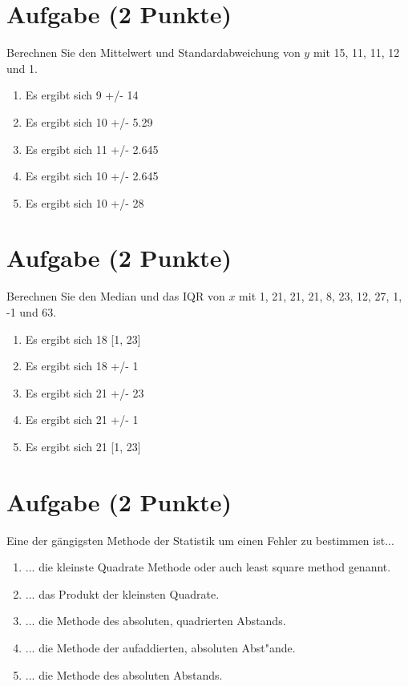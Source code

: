 \documentclass[a4paper, 10pt]{scrartcl}\usepackage[]{graphicx}\usepackage[]{xcolor}
\begin{document}
\section{Aufgabe \hfill (2 Punkte)}




Berechnen Sie den Mittelwert und Standardabweichung von $y$ mit 15, 11, 11, 12 und 1.



\begin{enumerate}
\item [\textbf{A} \msquare] Es ergibt sich 9 +/- 14
\item [\textbf{B} \msquare] Es ergibt sich 10 +/- 5.29
\item [\textbf{C} \msquare] Es ergibt sich 11 +/- 2.645
\item [\textbf{D} \msquare] Es ergibt sich 10 +/- 2.645
\item [\textbf{E} \msquare] Es ergibt sich 10 +/- 28
\end{enumerate} 

\section{Aufgabe \hfill (2 Punkte)}




Berechnen Sie den Median und das IQR von $x$ mit 1, 21, 21, 21, 8, 23, 12, 27, 1, -1 und 63.



\begin{enumerate}
\item [\textbf{A} \msquare] Es ergibt sich 18 [1, 23]
\item [\textbf{B} \msquare] Es ergibt sich 18 +/- 1
\item [\textbf{C} \msquare] Es ergibt sich 21 +/- 23
\item [\textbf{D} \msquare] Es ergibt sich 21 +/- 1
\item [\textbf{E} \msquare] Es ergibt sich 21 [1, 23]
\end{enumerate}

\section{Aufgabe \hfill (2 Punkte)}

Eine der g{\"a}ngigsten Methode der Statistik um einen Fehler zu bestimmen ist...



\begin{enumerate}
\item [\textbf{A} \msquare] ... die kleinste Quadrate Methode oder auch least square method genannt.
\item [\textbf{B} \msquare] ... das Produkt der kleinsten Quadrate.
\item [\textbf{C} \msquare] ... die Methode des absoluten, quadrierten Abstands.
\item [\textbf{D} \msquare] ... die Methode der aufaddierten, absoluten Abst{"a}nde.
\item [\textbf{E} \msquare] ... die Methode des absoluten Abstands.
\end{enumerate} 
\end{document}

